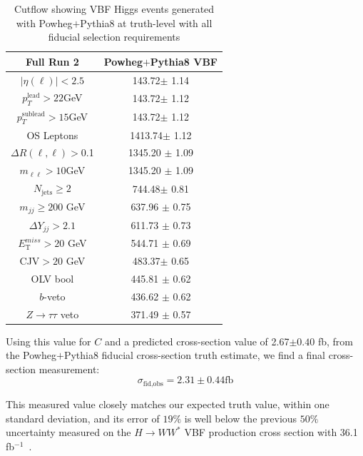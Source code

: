 \begin{table}[!ht]
\centering
\begin{tabular}{c||c}
\textbf{Full Run 2} & \textbf{Powheg$+$Pythia8 VBF} \\
\hline
$|\eta(\ell)|<2.5$ & 143.72$\pm$ 1.14 \\
$p_T^{\text{lead}}>22$GeV &143.72$\pm$ 1.12 \\
$p_T^{\text{sublead}}>15$GeV & 143.72$\pm$ 1.12\\
OS Leptons & 1413.74$\pm$ 1.12 \\
$\Delta R(\ell,\ell) >$0.1 & 1345.20 $\pm$ 1.09\\
$m_{\ell\ell}>10$GeV & 1345.20 $\pm$ 1.09 \\
$N_{\text{jets}}\geq2$ & 744.48$\pm$ 0.81\\
$m_{jj} \geq 200$ GeV & 637.96 $\pm$ 0.75 \\
$\Delta Y_{jj}>2.1$ & 611.73 $\pm$ 0.73 \\
$E_{\text{T}}^{miss}>20$ GeV & 544.71 $\pm$ 0.69 \\
CJV$>20$ GeV & 483.37$\pm$ 0.65 \\
OLV bool & 445.81 $\pm$ 0.62 \\
$b$-veto & 436.62 $\pm$ 0.62 \\
$Z\rightarrow\tau\tau$ veto & 371.49 $\pm$ 0.57\\
\hline
\end{tabular}
\caption{Cutflow showing VBF Higgs events generated with Powheg$+$Pythia8 at truth-level with all fiducial selection requirements}
\label{tab:truth}
\end{table}

Using this value for $C$ and a predicted cross-section value of 2.67$\pm 0.40$ fb, from the Powheg$+$Pythia8 fiducial cross-section truth estimate, we find a final cross-section measurement:
\begin{equation}
\sigma_{\text{fid,obs}} = 2.31 \pm 0.44 \text{fb} 
\end{equation}

This measured value closely matches our expected truth value, within one standard deviation, and its error of $19\%$ is well below the previous $50\%$ uncertainty measured on the $H\rightarrow WW^*$ VBF production cross section with 36.1 fb$^{-1}$~\cite{Aaboud_2019}. 

